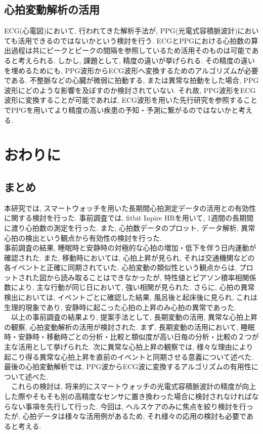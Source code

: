 \documentclass[report, 11pt, a4paper]{jsbook}
\begin{document}
\section{心拍変動解析の活用}
ECG(心電図)において, 行われてきた解析手法が, PPG(光電式容積脈波計)においても活用できるのではないかという検討を行う. ECGとPPGにおける心拍数の算出過程は共にピークとピークの間隔を参照しているため活用そのものは可能であると考えられる. しかし, 課題として, 精度の違いが挙げられる. その精度の違いを埋めるためにも, PPG波形からECG波形へ変換するためのアルゴリズムが必要である. 不整脈などの心臓が微弱に拍動する, または異常な拍動をした場合, PPG波形にどのような影響を及ぼすのか検討されていない. それ故, PPG波形をECG波形に変換することが可能であれば, ECG波形を用いた先行研究を参照することでPPGを用いてより精度の高い疾患の予知・予測に繋がるのではないかと考える. \\


\chapter{おわりに}

\section{まとめ}
本研究では, スマートウォッチを用いた長期間心拍測定データの活用との有効性に関する検討を行った. 事前調査では, fitbit Inpire HRを用いて, 1週間の長期間に渡り心拍数の測定を行った. また, 心拍数データのプロット, データ解析, 異常心拍の検出という観点から有効性の検討を行った. \\
事前調査の結果, 睡眠時と安静時の対極的な心拍の増加・低下を伴う日内運動が確認された. また, 移動時においては, 心拍上昇が見られ, それは交通機関などの各イベントと正確に同期されていた. 心拍変動の類似性という観点からは, プロットされた図から読み取ることはできなかったが, 特性値とピアソン積率相関係数により, 主な行動が同じ日において, 強い相関が見られた. さらに, 心拍の異常検出においては, イベントごとに確認した結果, 風呂後と起床後に見られ, これは生理的現象であり, 安静時に起こった心拍の上昇のみ心拍の異常であった. \\
　以上の事前調査の結果より, 提案手法として, 長期変動の活用, 異常な心拍上昇の観察, 心拍変動解析の活用が検討された. まず, 長期変動の活用において, 睡眠時・安静時・移動時ごとの分析・比較と類似度が高い日毎の分析・比較の２つが主な活用として挙げられた. 次に異常な心拍上昇の観察では, 様々な理由により起こり得る異常な心拍上昇を直前のイベントと同期させる意義について述べた. 最後の心拍変動解析では, PPG波からECG波に変換するアルゴリズムの有用性について述べた.\\
　これらの検討は, 将来的にスマートウォッチの光電式容積脈波計の精度が向上した際やそもそも別の高精度なセンサに置き換わった場合に検討されなければならない事項を先行して行った. 今回は, ヘルスケアのみに焦点を絞り検討を行ったが, 心拍データは様々な活用例があるため, それ様々の応用の検討も必要であると考える. 
\end{document}

